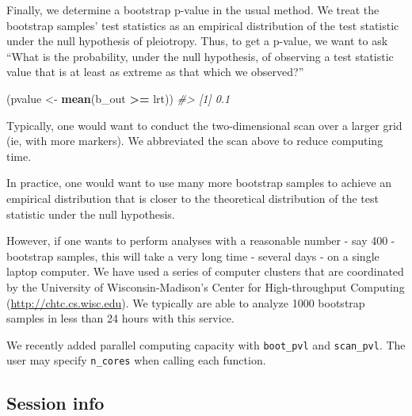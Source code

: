 \documentclass{book}
\newenvironment{Shaded}{\begin{snugshade}}{\end{snugshade}}
\newcommand{\CommentTok}[1]{\textcolor[rgb]{0.56,0.35,0.01}{\textit{#1}}}
\newcommand{\KeywordTok}[1]{\textcolor[rgb]{0.13,0.29,0.53}{\textbf{#1}}}
\newcommand{\NormalTok}[1]{#1}
\newcommand{\OperatorTok}[1]{\textcolor[rgb]{0.81,0.36,0.00}{\textbf{#1}}}
\newcommand{\StringTok}[1]{\textcolor[rgb]{0.31,0.60,0.02}{#1}}
\begin{document}
Finally, we determine a bootstrap p-value in the usual method. We treat
the bootstrap samples' test statistics as an empirical distribution of
the test statistic under the null hypothesis of pleiotropy. Thus, to get
a p-value, we want to ask ``What is the probability, under the null
hypothesis, of observing a test statistic value that is at least as
extreme as that which we observed?''

\begin{Shaded}
\begin{Highlighting}[]
\NormalTok{(pvalue <-}\StringTok{ }\KeywordTok{mean}\NormalTok{(b_out }\OperatorTok{>=}\StringTok{ }\NormalTok{lrt))}
\CommentTok{#> [1] 0.1}
\end{Highlighting}
\end{Shaded}

Typically, one would want to conduct the two-dimensional scan over a
larger grid (ie, with more markers). We abbreviated the scan above to
reduce computing time.

In practice, one would want to use many more bootstrap samples to
achieve an empirical distribution that is closer to the theoretical
distribution of the test statistic under the null hypothesis.

However, if one wants to perform analyses with a reasonable number - say
400 - bootstrap samples, this will take a very long time - several days
- on a single laptop computer. We have used a series of computer
clusters that are coordinated by the University of Wisconsin-Madison's
Center for High-throughput Computing (\url{http://chtc.cs.wisc.edu}). We
typically are able to analyze 1000 bootstrap samples in less than 24
hours with this service.

We recently added parallel computing capacity with \texttt{boot\_pvl}
and \texttt{scan\_pvl}. The user may specify \texttt{n\_cores} when
calling each function.

\hypertarget{session-info}{%
\subsection{Session info}\label{session-info-2}}
\end{document}
